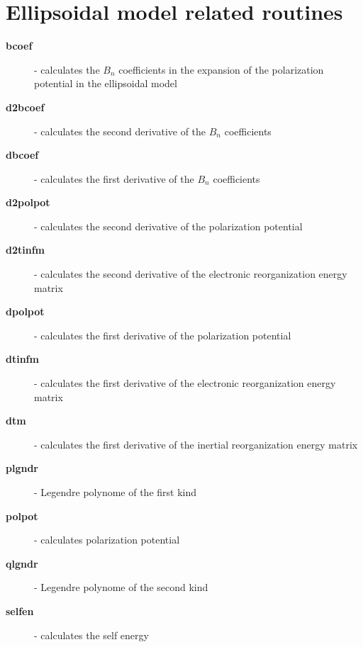 \documentclass[oneside,11pt,openany]{book}
\newcommand{\tw}{\ttfamily}
\begin{document}
%
\section{Ellipsoidal model related routines}
\begin{description}
\item[{\tw\bf bcoef}] - calculates the $B_n$ coefficients in the
                     expansion of the polarization potential
                     in the ellipsoidal model
\item[{\tw\bf d2bcoef}] - calculates the second derivative of the
                       $B_n$ coefficients
\item[{\tw\bf dbcoef}] - calculates the first derivative of the
                       $B_n$ coefficients
\item[{\tw\bf d2polpot}] - calculates the second derivative of the
                        polarization potential
\item[{\tw\bf d2tinfm}] - calculates the second derivative of the
                       electronic reorganization energy matrix
\item[{\tw\bf dpolpot}] - calculates the first derivative of the
                       polarization potential
\item[{\tw\bf dtinfm}] - calculates the first derivative of the
                      electronic reorganization energy matrix
\item[{\tw\bf dtm}] - calculates the first derivative of the
                   inertial reorganization energy matrix
\item[{\tw\bf plgndr}] - Legendre polynome of the first kind
\item[{\tw\bf polpot}] - calculates polarization potential
\item[{\tw\bf qlgndr}] - Legendre polynome of the second kind
\item[{\tw\bf selfen}] - calculates the self energy
\end{description}

%
\end{document}
